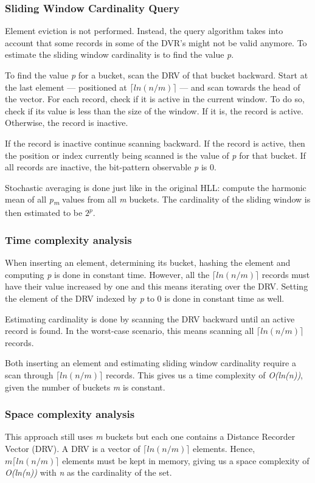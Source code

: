 \subsubsection*{Sliding Window Cardinality Query} 
Element eviction is not performed. Instead, the query algorithm takes into account that some records in some of the DVR's might not be valid anymore. To estimate the sliding window cardinality is to find the value \textit{p}. 

To find the value \textit{p} for a bucket, scan the DRV of that bucket backward. Start at the last element --- positioned at \textit{$\lceil ln(n/m) \rceil$} --- and scan towards the head of the vector. For each record, check if it is active in the current window. To do so, check if its value is less than the size of the window. If it is, the record is active. Otherwise, the record is inactive.

If the record is inactive continue scanning backward. If the record is active, then the position or index currently being scanned is the value of \textit{p} for that bucket. If all records are inactive, the bit-pattern observable \textit{p} is 0.

Stochastic averaging is done just like in the original HLL: compute the harmonic mean of all \textit{p\textsubscript{m}} values from all \textit{m} buckets. The cardinality of the sliding window is then estimated to be $2^\textit{p}$.

\subsubsection*{Time complexity analysis}
When inserting an element, determining its bucket, hashing the element and computing \textit{p} is done in constant time. However, all the  \textit{$\lceil ln(n/m) \rceil$} records must have their value increased by one and this means iterating over the DRV. Setting the element of the DRV indexed by \textit{p} to 0 is done in constant time as well. 

Estimating cardinality is done by scanning the DRV backward until an active record is found. In the worst-case scenario, this means scanning all \textit{$\lceil ln(n/m) \rceil$} records.

Both inserting an element and estimating sliding window cardinality require a scan through \textit{$\lceil ln(n/m) \rceil$} records. This gives us a time complexity of \textit{O(\textit{ln(n)})}, given the number of buckets \textit{m} is constant. 

\subsubsection*{Space complexity analysis}
This approach still uses \textit{m} buckets but each one contains a Distance Recorder Vector (DRV). A DRV is a vector of \textit{$\lceil ln(n/m) \rceil$} elements. Hence, \textit{$m \lceil ln(n/m) \rceil$} elements must be kept in memory, giving us a space complexity of \textit{O(ln(n))} with \textit{n} as the cardinality of the set.

